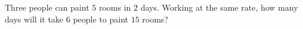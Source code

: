 Three people can paint $5$ rooms in $2$ days. Working at the same rate, how many days will it take $6$ people to paint $15$ rooms?
